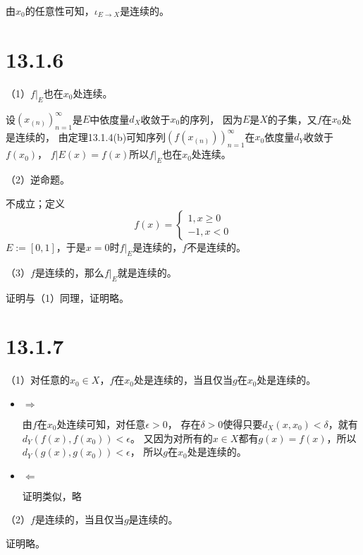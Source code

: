 \documentclass{article}
\begin{document}
由$x_0$的任意性可知，$\iota _{E \to X}$是连续的。

\section*{13.1.6}

（1）$f|_E$也在$x_0$处连续。

设$(x_{(n)})_{n = 1}^\infty$是$E$中依度量$d_X$收敛于$x_0$的序列，
因为$E$是$X$的子集，又$f$在$x_0$处是连续的，
由定理13.1.4(b)可知序列$(f(x_{(n)}))_{n = 1}^\infty$在$x_0$依度量$d_Y$收敛于$f(x_0)$，
$f|E(x) = f(x)$所以$f|_E$也在$x_0$处连续。

（2）逆命题。

不成立；定义
\begin{equation*}
  f(x) = \begin{cases}
    1, x \geq 0 \\
    -1, x < 0
  \end{cases}
\end{equation*}
$E := [0, 1]$，于是$x = 0$时$f|_E$是连续的，$f$不是连续的。

（3）$f$是连续的，那么$f|_E$就是连续的。

证明与（1）同理，证明略。


\section*{13.1.7}

（1）对任意的$x_0 \in X$，$f$在$x_0$处是连续的，当且仅当$g$在$x_0$处是连续的。

\begin{itemize}
  \item $\Rightarrow$

        由$f$在$x_0$处连续可知，对任意$\epsilon > 0$，
        存在$\delta > 0$使得只要$d_X(x, x_0) < \delta$，就有$d_Y(f(x), f(x_0)) < \epsilon$。
        又因为对所有的$x \in X$都有$g(x) = f(x)$，所以$d_Y(g(x), g(x_0)) < \epsilon$，
        所以$g$在$x_0$处是连续的。

  \item $\Leftarrow$

        证明类似，略
\end{itemize}

（2）$f$是连续的，当且仅当$g$是连续的。

证明略。
\end{document}
